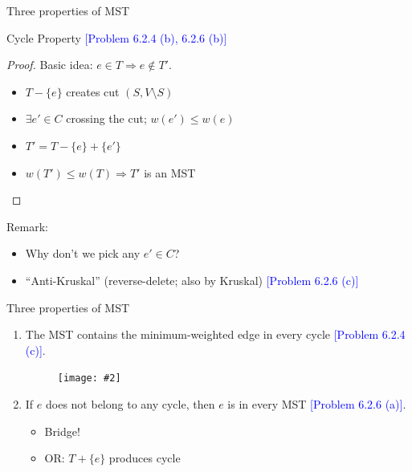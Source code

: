 \documentclass{beamer}
\newcommand{\set}[1]{\{ #1 \}}
\newcommand{\problemno}[1]{\textcolor{blue}{\scriptsize [Problem #1]}}
\newcommand{\fignocaption}[2]
{
  \begin{figure}[htp]
    \centering
      \texttt{[image: \#2]}
  \end{figure}
}
\begin{document}
\begin{frame}{Three properties of MST}
  \begin{block}{Cycle Property \problemno{6.2.4 (b), 6.2.6 (b)}}
  \begin{proof}
    Basic idea: $e \in T \Rightarrow e \notin T'$.
    \begin{itemize}
      \item $T - \set{e}$ creates cut $(S, V \setminus S)$
      \item $\exists e' \in C$ crossing the cut; $w(e') \leq w(e)$
      \item $T' = T - \set{e} + \set{e'}$
      \item $w(T') \leq w(T) \Rightarrow T'$ is an MST
    \end{itemize}
  \end{proof}
  \end{block}

  \begin{alertblock}{Remark:}
    \begin{itemize}
      \item Why don't we pick any $e' \in C$?
      \item ``Anti-Kruskal'' (reverse-delete; also by Kruskal) \problemno{6.2.6
      (c)}
    \end{itemize}
  \end{alertblock}
\end{frame}
\begin{frame}{Three properties of MST}
  \begin{enumerate}
	\item The MST contains the minimum-weighted edge in every cycle
	\problemno{6.2.4 (c)}.
		\fignocaption{width = 0.20\textwidth}{fig/cycle-property-inverse.pdf}
	\item If $e$ does not belong to any cycle, then $e$ is in every MST
	\problemno{6.2.6 (a)}.
	  \begin{itemize}
	    \item Bridge!
	    \item OR: $T + \set{e}$ produces cycle
	  \end{itemize}
  \end{enumerate}
\end{frame}
\end{document}
